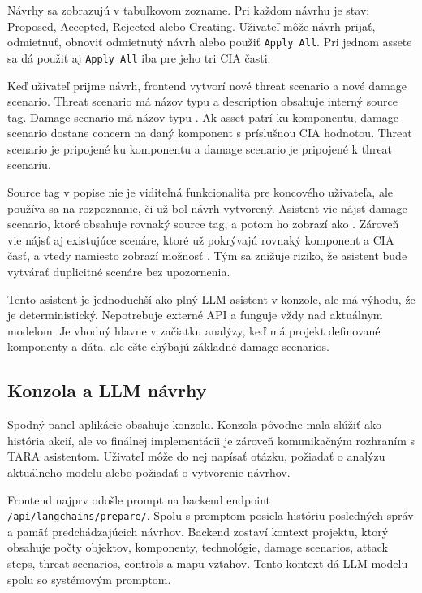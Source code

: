 \documentclass[11pt]{article}
\begin{document}
Návrhy sa zobrazujú v tabuľkovom zozname. Pri každom návrhu je stav: Proposed, Accepted, Rejected alebo Creating. Uživateľ môže návrh prijať, odmietnuť, obnoviť odmietnutý návrh alebo použiť \texttt{Apply All}. Pri jednom assete sa dá použiť aj \texttt{Apply All} iba pre jeho tri CIA časti.

Keď uživateľ prijme návrh, frontend vytvorí nové threat scenario a nové damage scenario. Threat scenario má názov typu  a description obsahuje interný source tag. Damage scenario má názov typu . Ak asset patrí ku komponentu, damage scenario dostane concern na daný komponent s príslušnou CIA hodnotou. Threat scenario je pripojené ku komponentu a damage scenario je pripojené k threat scenariu.

Source tag v popise nie je viditeľná funkcionalita pre koncového uživateľa, ale používa sa na rozpoznanie, či už bol návrh vytvorený. Asistent vie nájsť damage scenario, ktoré obsahuje rovnaký source tag, a potom ho zobrazí ako . Zároveň vie nájsť aj existujúce scenáre, ktoré už pokrývajú rovnaký komponent a CIA časť, a vtedy namiesto  zobrazí možnosť . Tým sa znižuje riziko, že asistent bude vytvárať duplicitné scenáre bez upozornenia.

Tento asistent je jednoduchší ako plný LLM asistent v konzole, ale má výhodu, že je deterministický. Nepotrebuje externé API a funguje vždy nad aktuálnym modelom. Je vhodný hlavne v začiatku analýzy, keď má projekt definované komponenty a dáta, ale ešte chýbajú základné damage scenarios.

\subsection{Konzola a LLM návrhy}

Spodný panel aplikácie obsahuje konzolu. Konzola pôvodne mala slúžiť ako história akcií, ale vo finálnej implementácii je zároveň komunikačným rozhraním s TARA asistentom. Uživateľ môže do nej napísať otázku, požiadať o analýzu aktuálneho modelu alebo požiadať o vytvorenie návrhov.

Frontend najprv odošle prompt na backend endpoint \texttt{/api/langchains/prepare/}. Spolu s promptom posiela históriu posledných správ a pamäť predchádzajúcich návrhov. Backend zostaví kontext projektu, ktorý obsahuje počty objektov, komponenty, technológie, damage scenarios, attack steps, threat scenarios, controls a mapu vzťahov. Tento kontext dá LLM modelu spolu so systémovým promptom.
\end{document}
